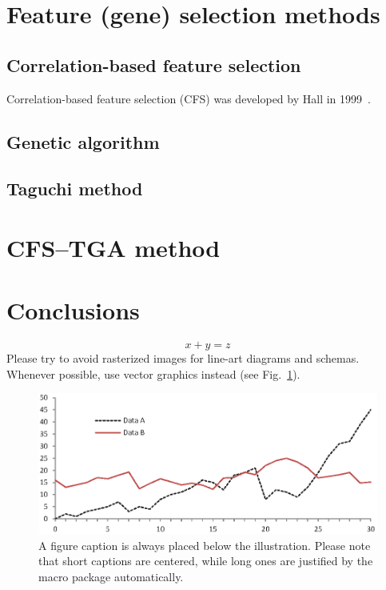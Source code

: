 \documentclass[runningheads]{llncs}
\begin{document}
\section{Feature (gene) selection methods}

\subsection{Correlation-based feature selection}\label{Correlation-based feature selection}
Correlation-based feature selection (CFS) was developed by Hall in 1999~\cite{hall1998correlation}.

\subsection{Genetic algorithm}\label{Genetic algorithm}

\subsection{Taguchi method}

\section{CFS–TGA method}

\section{Conclusions}

\begin{equation}
x + y = z
\end{equation}
Please try to avoid rasterized images for line-art diagrams and
schemas. Whenever possible, use vector graphics instead (see
Fig.~\ref{fig1}).

\begin{figure}
\includegraphics[width=\textwidth]{fig1.eps}
\caption{A figure caption is always placed below the illustration.
Please note that short captions are centered, while long ones are
justified by the macro package automatically.} \label{fig1}
\end{figure}
%
%
%
\nocite{*}



%
\end{document}
